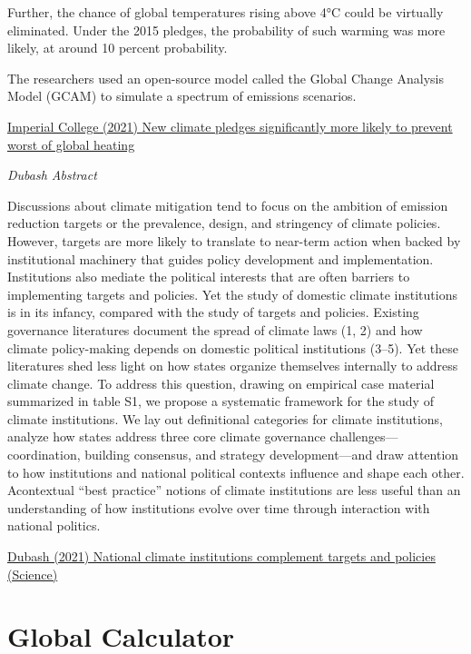 \documentclass[
]{book}
\begin{document}
Further, the chance of global temperatures rising above 4°C could be virtually eliminated. Under the 2015 pledges, the probability of such warming was more likely, at around 10 percent probability.

The researchers used an open-source model called the Global Change Analysis Model (GCAM) to simulate a spectrum of emissions scenarios.

\href{https://www.imperial.ac.uk/news/231739/new-climate-pledges-significantly-more-likely/}{Imperial College (2021) New climate pledges significantly more likely to prevent worst of global heating}

\emph{Dubash Abstract}

Discussions about climate mitigation tend to focus on the ambition of emission reduction targets or the prevalence, design, and stringency of climate policies. However, targets are more likely to translate to near-term action when backed by institutional machinery that guides policy development and implementation. Institutions also mediate the political interests that are often barriers to implementing targets and policies. Yet the study of domestic climate institutions is in its infancy, compared with the study of targets and policies. Existing governance literatures document the spread of climate laws (1, 2) and how climate policy-making depends on domestic political institutions (3--5). Yet these literatures shed less light on how states organize themselves internally to address climate change. To address this question, drawing on empirical case material summarized in table S1, we propose a systematic framework for the study of climate institutions. We lay out definitional categories for climate institutions, analyze how states address three core climate governance challenges---coordination, building consensus, and strategy development---and draw attention to how institutions and national political contexts influence and shape each other. Acontextual ``best practice'' notions of climate institutions are less useful than an understanding of how institutions evolve over time through interaction with national politics.

\href{https://www.science.org/doi/10.1126/science.abm1157}{Dubash (2021) National climate institutions complement targets and policies (Science)}

\hypertarget{global-calculator}{%
\section{Global Calculator}\label{global-calculator}}
\end{document}
